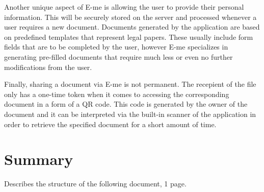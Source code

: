 Another unique aspect of E-me is allowing the user to provide their personal information.
This will be securely stored on the server and processed whenever a user requires a new document.
Documents generated by the application are based on predefined templates that represent legal papers.
These usually include form fields that are to be completed by the user, however E-me specializes in generating pre-filled documents that require 
much less or even no further modifications from the user.

Finally, sharing a document via E-me is not permanent.
The recepient of the file only has a one-time token when it comes to accessing the corresponding document in a form of a QR code.
This code is generated by the owner of the document and it can be interpreted via the built-in scanner of the application in order to 
retrieve the specified document for a short amount of time. 

\section{Summary}\label{sec:INTRO:sum}
Describes the structure of the following document, 1 page.

